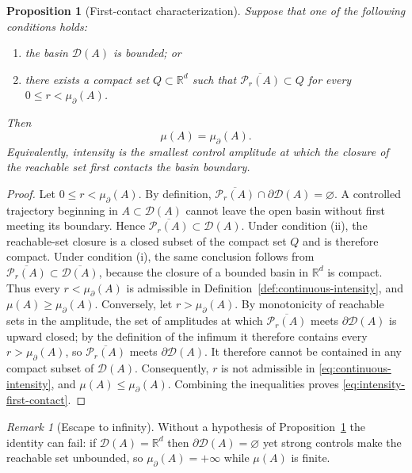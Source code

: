 \documentclass[pdflatex,sn-mathphys-num]{sn-jnl}
\numberwithin{equation}{section}
\theoremstyle{thmstyleone}%
\newtheorem{proposition}[theorem]{Proposition}
\theoremstyle{definition}
\theoremstyle{remark}
\newtheorem{remark}[theorem]{Remark}
\begin{document}
\begin{proposition}[First-contact characterization]
\label{prop:first-contact}
Suppose that one of the following conditions holds:
\begin{enumerate}
\item the basin $\mathcal D(A)$ is bounded; or
\item there exists a compact set $Q\subset\mathbb R^d$ such that
$\overline{\mathcal P_r(A)}\subset Q$ for every $0\leq r<\mu_{\partial}(A)$.
\end{enumerate}
Then
\begin{equation}
\label{eq:intensity-first-contact}
    \mu(A)=\mu_{\partial}(A).
\end{equation}
Equivalently, intensity is the smallest control amplitude at which the closure of the reachable set first contacts the basin boundary.
\end{proposition}

\begin{proof}
Let $0\leq r<\mu_{\partial}(A)$. By definition,
    $\overline{\mathcal P_r(A)}
    \cap\partial\mathcal D(A)=\varnothing$.
A controlled trajectory beginning in $A\subset\mathcal D(A)$ cannot leave the open basin without first meeting its boundary. Hence
    $\overline{\mathcal P_r(A)}
    \subset\mathcal D(A)$.
Under condition (ii), the reachable-set closure is a closed subset of the compact set $Q$ and is therefore compact. Under condition (i), the same conclusion follows from
    $\overline{\mathcal P_r(A)}
    \subset\overline{\mathcal D(A)}$,
because the closure of a bounded basin in $\mathbb R^d$ is compact. Thus every $r<\mu_{\partial}(A)$ is admissible in Definition~\ref{def:continuous-intensity}, and $\mu(A)\geq\mu_{\partial}(A)$. Conversely, let $r>\mu_{\partial}(A)$. By monotonicity of reachable sets in the amplitude, the set of amplitudes at which $\overline{\mathcal P_r(A)}$ meets $\partial\mathcal D(A)$ is upward closed; by the definition of the infimum it therefore contains every $r>\mu_{\partial}(A)$, so $\overline{\mathcal P_r(A)}$ meets $\partial\mathcal D(A)$. It therefore cannot be contained in any compact subset of $\mathcal D(A)$. Consequently, $r$ is not admissible in \eqref{eq:continuous-intensity}, and $\mu(A)\leq\mu_{\partial}(A)$. Combining the inequalities proves \eqref{eq:intensity-first-contact}.
\end{proof}

\begin{remark}[Escape to infinity]
\label{rem:escape-infinity}
Without a hypothesis of Proposition~\ref{prop:first-contact} the identity can fail: if $\mathcal D(A)=\mathbb R^d$ then $\partial\mathcal D(A)=\varnothing$ yet strong controls make the reachable set unbounded, so $\mu_\partial(A)=+\infty$ while $\mu(A)$ is finite.
\end{remark}
\end{document}
